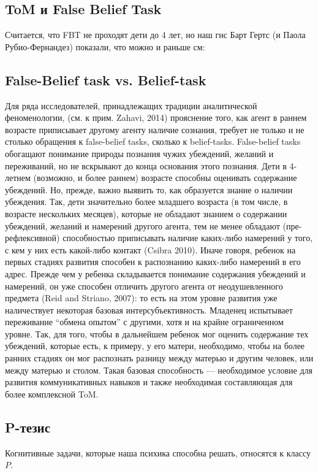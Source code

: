 \subsection{ToM и False Belief Task}
Считается, что FBT не проходят дети  до 4 лет, но наш гнс Барт Гертс (и Паола Рубио-Фернандез) показали, что можно и раньше см: \autocite{Rubio-Fernandez2013a}

\subsection {False-Belief task vs. Belief-task}

Для ряда исследователей, принадлежащих традиции аналитической феноменологии, (см. к прим. Zahavi, 2014) прояснение того, как агент в раннем возрасте приписывает другому агенту наличие сознания, требует не только и не столько обращения к false-belief tasks, сколько к belief-tasks. False-belief tasks обогащают понимание природы познания чужих убеждений, желаний и переживаний, но не вскрывают до конца основания этого познания. 
Дети в 4-летнем (возможно, и более раннем) возрасте способны оценивать содержание убеждений. Но, прежде, важно выявить то, как образуется знание о наличии убеждения. Так, дети значительно более младшего возраста (в том числе, в возрасте нескольких месяцев), которые не обладают знанием о содержании убеждений, желаний и намерений другого агента, тем не менее обладают (пре-рефлексивной) способностью приписывать наличие каких-либо намерений у того, с кем у них есть какой-либо контакт (Csibra 2010). Иначе говоря, ребенок на первых стадиях развития способен к распознанию каких-либо намерений  в его адрес. Прежде чем у ребенка складывается понимание содержания убеждений и намерений, он уже способен отличить другого агента от неодушевленного предмета (Reid and Striano, 2007): то есть на этом уровне развития уже наличествует некоторая базовая интерсубъективность. Младенец испытывает переживание “обмена опытом” с другими, хотя и на крайне ограниченном уровне.
Так, для того, чтобы в дальнейшем ребенок мог оценить содержание тех убеждений, которые есть, к примеру, у его матери, необходимо, чтобы на более ранних стадиях он мог распознать разницу между матерью и другим человек, или между матерью и столом. Такая базовая способность — необходимое условие для развития коммуникативных навыков и также необходимая составляющая для более комплексной ToM. 


\subsection{P-тезис}
Когнитивные задачи, которые наша психика способна решать, относятся к классу $P$.

